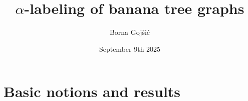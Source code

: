 \documentclass{beamer}
\title[$\alpha$-labeling of banana tree graphs]{\texorpdfstring{$\alpha$}{Alpha}-labeling of banana tree graphs}
\author{Borna Gojšić}
\institute{FER, University of Zagreb}
\date{September 9th 2025}
\begin{document}
\begin{frame}
  \titlepage
\end{frame}




\section{Basic notions and results}
\end{document}
